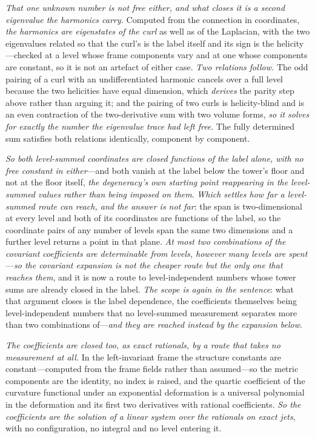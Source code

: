 \documentclass[11pt,a4paper]{article}
\theoremstyle{plain}
\theoremstyle{definition}
\theoremstyle{remark}
\begin{document}
\emph{That one unknown number is not free either, and what closes it is a second eigenvalue the harmonics
carry.} Computed from the connection in coordinates, \emph{the harmonics are eigenstates of the curl} as well
as of the Laplacian, with the two eigenvalues related so that the curl's is the label itself and its sign is
the helicity---checked at a level whose frame components vary and at one whose components are constant, so it
is not an artefact of either case. \emph{Two relations follow.} The odd pairing of a curl with an
undifferentiated harmonic cancels over a full level because the two helicities have equal dimension, which
\emph{derives} the parity step above rather than arguing it; and the pairing of two curls is helicity-blind
and is an even contraction of the two-derivative sum with two volume forms, \emph{so it solves for exactly the
number the eigenvalue trace had left free}. The fully determined sum satisfies both relations identically,
component by component.

\emph{So both level-summed coordinates are closed functions of the label alone, with no free constant in
either}---and both vanish at the label below the tower's floor and not at the floor itself, \emph{the
degeneracy's own starting point reappearing in the level-summed values rather than being imposed on them}.
\emph{Which settles how far a level-summed route can reach, and the answer is not far}: the span is
two-dimensional at every level and both of its coordinates are functions of the label, so the coordinate pairs
of any number of levels span the same two dimensions and a further level returns a point in that plane.
\emph{At most two combinations of the covariant coefficients are determinable from levels, however many levels
are spent}---\emph{so the covariant expansion is not the cheaper route but the only one that reaches them},
and it is now a route to level-independent numbers whose tower sums are already closed in the label.
\emph{The scope is again in the sentence}: what that argument closes is the label dependence, the coefficients
themselves being level-independent numbers that no level-summed measurement separates more than two combinations
of---\emph{and they are reached instead by the expansion
below}.

\emph{The coefficients are closed too, as exact rationals, by a route that takes no measurement at all.} In the
left-invariant frame the structure constants are constant---computed from the frame fields rather than
assumed---so the metric components are the identity, no index is raised, and the quartic coefficient of the
curvature functional under an exponential deformation is a universal polynomial in the deformation and its first
two derivatives with rational coefficients. \emph{So the coefficients are the solution of a linear system over
the rationals on exact jets}, with no configuration, no integral and no level entering it.
\end{document}
